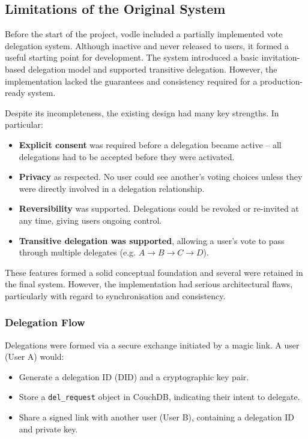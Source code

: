 \subsection{Limitations of the Original System}
Before the start of the project, vodle included a partially implemented vote delegation system. Although inactive and never released to users, it formed a useful starting point for development. The system introduced a basic invitation-based delegation model and supported transitive delegation. However, the implementation lacked the guarantees and consistency required for a production-ready system.

Despite its incompleteness, the existing design had many key strengths. In particular:
\begin{itemize}
  \item \textbf{Explicit consent} was required before a delegation became active -- all delegations had to be accepted before they were activated.
  \item \textbf{Privacy} as respected. No user could see another's voting choices unless they were directly involved in a delegation relationship.
  \item \textbf{Reversibility} was supported. Delegations could be revoked or re-invited at any time, giving users ongoing control.
  \item \textbf{Transitive delegation was supported}, allowing a user's vote to pass through multiple delegates (e.g. $A\to B\to C\to D$).
\end{itemize}

These features formed a solid conceptual foundation and several were retained in the final system. However, the implementation had serious architectural flaws, particularly with regard to synchronisation and consistency.

\subsubsection{Delegation Flow}
Delegations were formed via a secure exchange initiated by a magic link. A user (User A) would:
\begin{itemize}
  \item Generate a delegation ID (DID) and a cryptographic key pair.
  \item Store a \texttt{del\_request} object in CouchDB, indicating their intent to delegate.
  \item Share a signed link with another user (User B), containing a delegation ID and private key.
\end{itemize}

